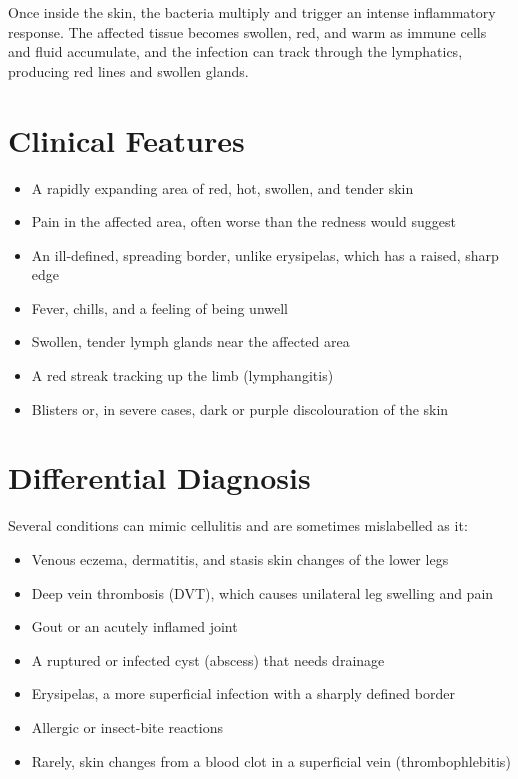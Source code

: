 Once inside the skin, the bacteria multiply and trigger an intense inflammatory response. The affected tissue becomes swollen, red, and warm as immune cells and fluid accumulate, and the infection can track through the lymphatics, producing red lines and swollen glands.

\section*{Clinical Features}
\begin{itemize}
    \item A rapidly expanding area of red, hot, swollen, and tender skin
    \item Pain in the affected area, often worse than the redness would suggest
    \item An ill-defined, spreading border, unlike erysipelas, which has a raised, sharp edge
    \item Fever, chills, and a feeling of being unwell
    \item Swollen, tender lymph glands near the affected area
    \item A red streak tracking up the limb (lymphangitis)
    \item Blisters or, in severe cases, dark or purple discolouration of the skin
\end{itemize}

\section*{Differential Diagnosis}
Several conditions can mimic cellulitis and are sometimes mislabelled as it:

\begin{itemize}
    \item Venous eczema, dermatitis, and stasis skin changes of the lower legs
    \item Deep vein thrombosis (DVT), which causes unilateral leg swelling and pain
    \item Gout or an acutely inflamed joint
    \item A ruptured or infected cyst (abscess) that needs drainage
    \item Erysipelas, a more superficial infection with a sharply defined border
    \item Allergic or insect-bite reactions
    \item Rarely, skin changes from a blood clot in a superficial vein (thrombophlebitis)
\end{itemize}

